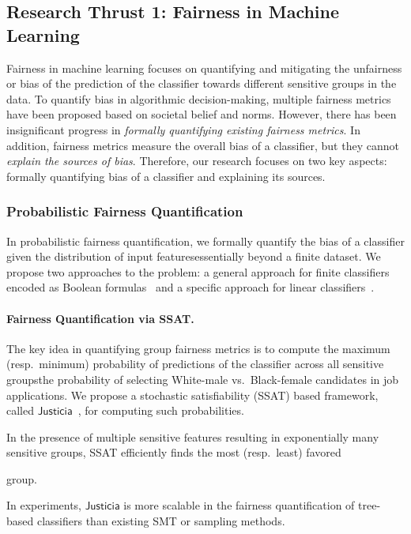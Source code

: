 \documentclass[10pt]{article}
\newif\iflongproposal
\begin{document}
	\subsection*{Research Thrust 1: Fairness in Machine Learning}
	
	Fairness in machine learning focuses on quantifying and mitigating the unfairness or bias of the prediction of the classifier towards different sensitive groups in the data. To quantify bias in algorithmic decision-making, multiple fairness metrics have been proposed based on societal belief and norms. However, there has been insignificant progress in \textit{formally quantifying existing fairness metrics}. In addition, fairness metrics measure the overall bias of a classifier, but they cannot  \textit{explain the sources of bias}. Therefore, our research focuses on two key aspects: formally quantifying bias of a classifier and explaining its sources.
	
	\subsubsection*{Probabilistic Fairness Quantification} In probabilistic fairness quantification, we formally quantify the bias of a classifier given the distribution of input features\textemdash essentially beyond a finite dataset. We propose two approaches to the problem: a general approach for finite classifiers encoded as Boolean formulas~\cite{ghosh2021justicia} and a specific approach for linear classifiers~\cite{ghosh2022algorithmic}.
	

	
	
	\paragraph{Fairness Quantification via SSAT.} The key idea in quantifying group fairness metrics is to compute the maximum (resp.\ minimum) probability of predictions of the classifier across all sensitive groups\textemdash the probability of selecting White-male vs.\ Black-female candidates in job applications. We propose a stochastic satisfiability (SSAT) based framework, called $\mathsf{Justicia}$~\cite{ghosh2021justicia}, for computing such probabilities. 
	\iflongproposal
	More specifically, the maximum probability becomes the solution of an existential-random (ER)-SSAT formula\textemdash we encode the classifier as a Boolean formula, the feature distribution via random Boolean variables, and compute the maximum conditional probability of the satisfaction of the formula for existentially quantified sensitive features.
	\fi
	In the presence of multiple sensitive features resulting in exponentially many sensitive groups, SSAT efficiently finds the most (resp.\ least) favored
	\iflongproposal
	group by the classifier, thanks to the significant progress in satisfiability (SAT) solving, and particularly in weighted model counting problem.
	\else
	group.
	\fi 
	In experiments, $\mathsf{Justicia}$ is more scalable in the fairness quantification of tree-based classifiers than existing SMT or sampling methods.
	
\end{document}
